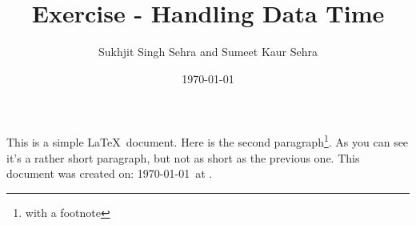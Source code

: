 \documentclass[12pt]{article}
\author{Sukhjit Singh Sehra and Sumeet Kaur Sehra}
\date{\today}
\title{Exercise - Handling Data Time}
\begin{document}
\maketitle

This is a simple \LaTeX\ document.
Here is the second paragraph\footnote{with a footnote}. 
As you can see it's a rather short paragraph, but not 
as short as the previous one. This document was 
created on: \today\ at \currenttime.
\end{document}
